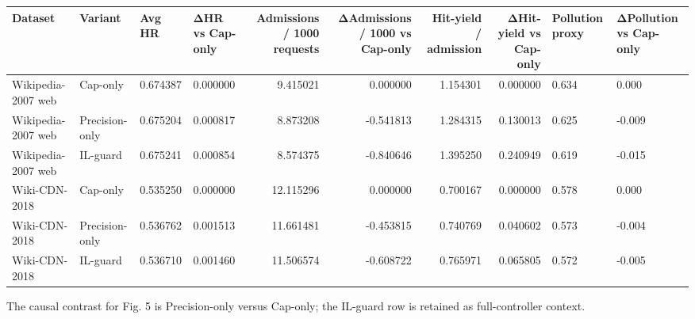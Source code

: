 \begin{tabular}{llllrrrrll}
\toprule
Dataset & Variant & Avg HR & ΔHR vs Cap-only & Admissions / 1000 requests & ΔAdmissions / 1000 vs Cap-only & Hit-yield / admission & ΔHit-yield vs Cap-only & Pollution proxy & ΔPollution vs Cap-only \\
\midrule
Wikipedia-2007 web & Cap-only & 0.674387 & 0.000000 & 9.415021 & 0.000000 & 1.154301 & 0.000000 & 0.634 & 0.000 \\
Wikipedia-2007 web & Precision-only & 0.675204 & 0.000817 & 8.873208 & -0.541813 & 1.284315 & 0.130013 & 0.625 & -0.009 \\
Wikipedia-2007 web & IL-guard & 0.675241 & 0.000854 & 8.574375 & -0.840646 & 1.395250 & 0.240949 & 0.619 & -0.015 \\
Wiki-CDN-2018 & Cap-only & 0.535250 & 0.000000 & 12.115296 & 0.000000 & 0.700167 & 0.000000 & 0.578 & 0.000 \\
Wiki-CDN-2018 & Precision-only & 0.536762 & 0.001513 & 11.661481 & -0.453815 & 0.740769 & 0.040602 & 0.573 & -0.004 \\
Wiki-CDN-2018 & IL-guard & 0.536710 & 0.001460 & 11.506574 & -0.608722 & 0.765971 & 0.065805 & 0.572 & -0.005 \\
\bottomrule
\end{tabular}
\vspace{0.4ex}
\noindent\scriptsize{The causal contrast for Fig. 5 is Precision-only versus Cap-only; the IL-guard row is retained as full-controller context.}
